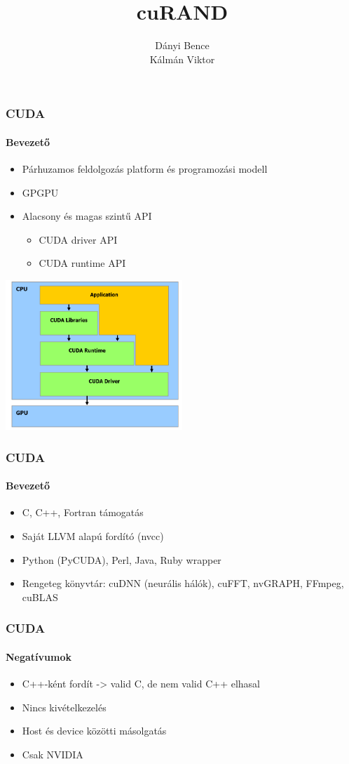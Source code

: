 \documentclass[xetex]{beamer}
\title{cuRAND}
\author{Dányi Bence\\ Kálmán Viktor}
\begin{document}
  \frame{\titlepage}
  \begin{frame}
    \frametitle{CUDA}
    \framesubtitle{Bevezető}
    \begin{itemize}
      \item Párhuzamos feldolgozás platform és programozási modell
      \item GPGPU
      \pause
      \item Alacsony és magas szintű API
        \begin{itemize}
          \item CUDA driver API
          \item CUDA runtime API
        \end{itemize}
    \end{itemize}

    \begin{center}
      \includegraphics[width=0.5\textwidth]{figures/cudapi.png}
    \end{center}
  \end{frame}
  \begin{frame}
    \frametitle{CUDA}
    \framesubtitle{Bevezető}
    \begin{itemize}
      \item C, C++, Fortran támogatás
      \item Saját LLVM alapú fordító (nvcc)
      \item Python (PyCUDA), Perl, Java, Ruby wrapper
      \item Rengeteg könyvtár: cuDNN (neurális hálók), cuFFT, nvGRAPH, FFmpeg, cuBLAS
    \end{itemize}

  \end{frame}
  \begin{frame}
    \frametitle{CUDA}
    \framesubtitle{Negatívumok}
    \begin{itemize}
      \item C++-ként fordít -> valid C, de nem valid C++ elhasal
      \item Nincs kivételkezelés
      \item Host és device közötti másolgatás
      \item Csak NVIDIA
    \end{itemize}
  \end{frame}
\end{document}
